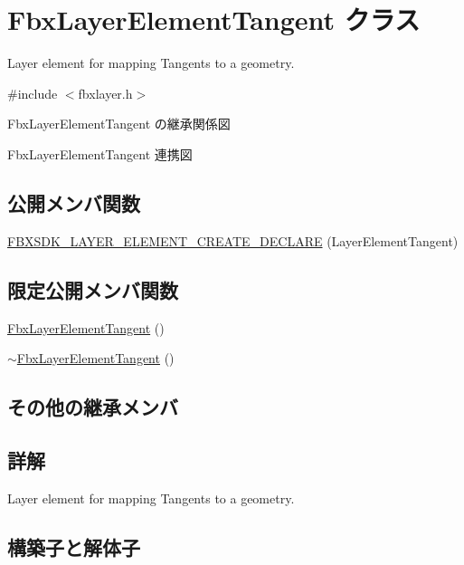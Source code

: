 \hypertarget{class_fbx_layer_element_tangent}{}\section{Fbx\+Layer\+Element\+Tangent クラス}
\label{class_fbx_layer_element_tangent}


Layer element for mapping Tangents to a geometry.  




{\ttfamily \#include $<$fbxlayer.\+h$>$}



Fbx\+Layer\+Element\+Tangent の継承関係図


Fbx\+Layer\+Element\+Tangent 連携図
\subsection*{公開メンバ関数}
\begin{DoxyCompactItemize}
\item 
\hyperlink{class_fbx_layer_element_tangent_af6de658c6e0e7ac0702ca2f1b0d6fbdf}{F\+B\+X\+S\+D\+K\+\_\+\+L\+A\+Y\+E\+R\+\_\+\+E\+L\+E\+M\+E\+N\+T\+\_\+\+C\+R\+E\+A\+T\+E\+\_\+\+D\+E\+C\+L\+A\+RE} (Layer\+Element\+Tangent)
\end{DoxyCompactItemize}
\subsection*{限定公開メンバ関数}
\begin{DoxyCompactItemize}
\item 
\hyperlink{class_fbx_layer_element_tangent_a60810894777829d4fc767f0f63706523}{Fbx\+Layer\+Element\+Tangent} ()
\item 
\hyperlink{class_fbx_layer_element_tangent_a009269c1cc4c57a727e469e66fc5a09b}{$\sim$\+Fbx\+Layer\+Element\+Tangent} ()
\end{DoxyCompactItemize}
\subsection*{その他の継承メンバ}


\subsection{詳解}
Layer element for mapping Tangents to a geometry. 

\subsection{構築子と解体子}
\mbox{\label{class_fbx_layer_element_tangent_a60810894777829d4fc767f0f63706523}} 
